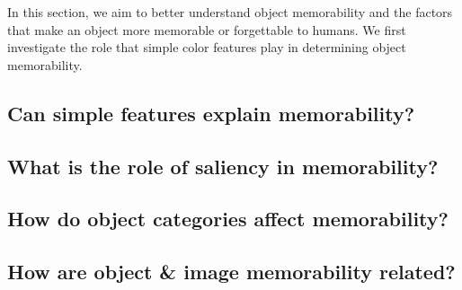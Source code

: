 In this section, we aim to better understand object memorability and the factors that make an object more memorable or forgettable to humans. We first investigate the role that simple color features play in determining object memorability.

\subsection{Can simple features explain memorability?}



\subsection{What is the role of saliency in memorability?}

 \label{sec:fix}

\subsection{How do object categories affect memorability?}



\subsection{How are object \& image memorability related?}

 